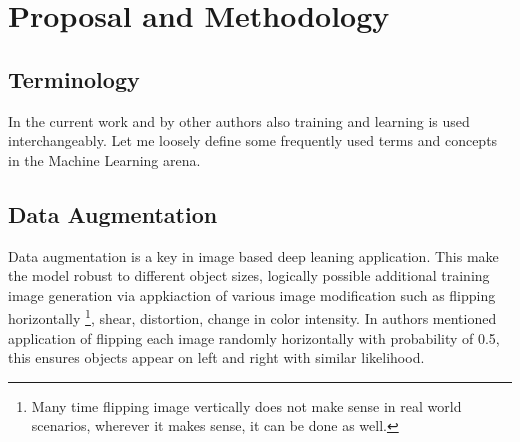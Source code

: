 
\chapter{Proposal and Methodology}

\section{Terminology}
In the current work and by other authors also training and learning is used interchangeably. Let me loosely define some frequently used terms and concepts in the Machine Learning arena.

\section{Data Augmentation}
Data augmentation  is a key in image based deep leaning application. This make the model robust to different object sizes, logically possible  additional training image generation via appkiaction of various image modification such as flipping horizontally \footnote{Many time flipping image vertically does not make sense in real world scenarios, wherever it makes sense, it can be done as well.}, shear, distortion, change in color intensity. In \cite{liu2016ssd} authors mentioned application of flipping each image randomly horizontally with probability of 0.5, this ensures objects appear on left and right with similar likelihood.

